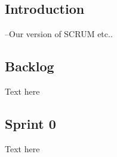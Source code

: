 

\subsection{Introduction}
--Our version of SCRUM etc..

\subsection{Backlog}
Text here

\subsection{Sprint 0}
Text here
